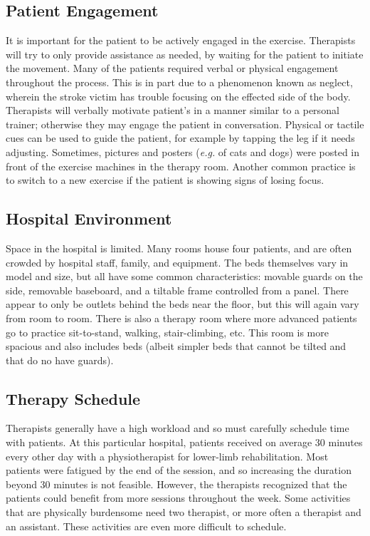 \documentclass[12pt]{report}
\begin{document}
	\subsection{Patient Engagement} 
	 It is important for the patient to be actively engaged in the exercise. Therapists will try to only provide assistance as needed, by waiting for the patient to initiate the movement. Many of the patients required verbal or physical engagement throughout the process. This is in part due to a phenomenon known as neglect, wherein the stroke victim has trouble focusing on the effected side of the body. Therapists will verbally motivate patient's in a manner similar to a personal trainer; otherwise they may engage the patient in conversation. Physical or tactile cues can be used to guide the patient, for example by tapping the leg if it needs adjusting. Sometimes, pictures and posters (\textit{e.g.} of cats and dogs) were posted in front of the exercise machines in the therapy room. Another common practice is to switch to a new exercise if the patient is showing signs of losing focus. 
	 
	 \subsection{Hospital Environment}
	Space in the hospital is limited. Many rooms house four patients, and are often crowded by hospital staff, family, and equipment. The beds themselves vary in model and size, but all have some common characteristics: movable guards on the side, removable baseboard, and a tiltable frame controlled from a panel. There appear to only be outlets behind the beds near the floor, but this will again vary from room to room. 
	There is also a therapy room where more advanced patients go to practice sit-to-stand, walking, stair-climbing, etc. This room is more spacious and also includes beds (albeit simpler beds that cannot be tilted and that do no have guards). 
	
	\subsection{Therapy Schedule}
	
	Therapists generally have a high workload and so must carefully schedule time with patients. At this particular hospital, patients received on average 30 minutes every other day with a physiotherapist for lower-limb rehabilitation. Most patients were fatigued by the end of the session, and so increasing the duration beyond 30 minutes is not feasible. However, the therapists recognized that the patients could benefit from more sessions throughout the week. Some activities that are physically burdensome need two therapist, or more often a therapist and an assistant. These activities are even more difficult to schedule.
	
\end{document}
